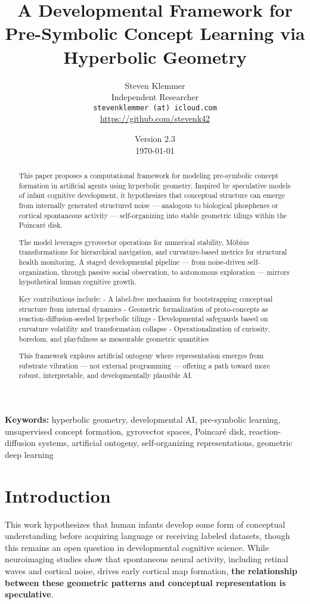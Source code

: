 \documentclass[10pt]{article}
\title{A Developmental Framework for Pre-Symbolic Concept Learning via Hyperbolic Geometry}
\author{
  Steven Klemmer \\
  \small Independent Researcher \\
  \small \texttt{stevenklemmer (at) icloud.com} \\
  \small \url{https://github.com/stevenk42}
}
\date{Version 2.3 \\ \today}
\begin{document}
\maketitle

\begin{abstract}
This paper proposes a computational framework for modeling pre-symbolic concept formation in artificial agents using hyperbolic geometry. Inspired by speculative models of infant cognitive development, it hypothesizes that conceptual structure can emerge from internally generated structured noise — analogous to biological phosphenes or cortical spontaneous activity — self-organizing into stable geometric tilings within the Poincaré disk.

The model leverages gyrovector operations for numerical stability, Möbius transformations for hierarchical navigation, and curvature-based metrics for structural health monitoring. A staged developmental pipeline — from noise-driven self-organization, through passive social observation, to autonomous exploration — mirrors hypothetical human cognitive growth.

Key contributions include:  
- A label-free mechanism for bootstrapping conceptual structure from internal dynamics  
- Geometric formalization of proto-concepts as reaction-diffusion-seeded hyperbolic tilings  
- Developmental safeguards based on curvature volatility and transformation collapse  
- Operationalization of curiosity, boredom, and playfulness as measurable geometric quantities

This framework explores artificial ontogeny where representation emerges from substrate vibration — not external programming — offering a path toward more robust, interpretable, and developmentally plausible AI.
\end{abstract}

\noindent
\textbf{Keywords:} hyperbolic geometry, developmental AI, pre-symbolic learning, unsupervised concept formation, gyrovector spaces, Poincaré disk, reaction-diffusion systems, artificial ontogeny, self-organizing representations, geometric deep learning

\section{Introduction}

This work hypothesizes that human infants develop some form of conceptual understanding before acquiring language or receiving labeled datasets, though this remains an open question in developmental cognitive science. While neuroimaging studies show that spontaneous neural activity, including retinal waves and cortical noise, drives early cortical map formation, \textbf{the relationship between these geometric patterns and conceptual representation is speculative}.
\end{document}
